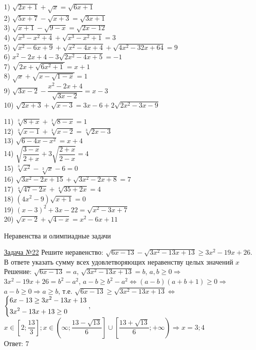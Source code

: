 \documentclass[a4paper,12pt]{article} %
\begin{document}
\begin{minipage}{0.5\linewidth}
	1) $\sqrt{2x+1}+\sqrt{x}=\sqrt{6x+1}$ \\
    2) $\sqrt{5x+7}-\sqrt{x+3}=\sqrt{3x+1}$ \\
    3) $\sqrt{x+1}-\sqrt{9-x}=\sqrt{2x-12}$ \\
    4) $\sqrt{x^3-x^2+4}+\sqrt{x^3-x^2+1}=3$ \\
    5) $\sqrt{x^2-6x+9}+\sqrt{x^2-4x+4}+\sqrt{4x^2-32x+64}=9$ \\
    6) $x^2-2x+4-3\sqrt{2x^2-4x+5}=-1$ \\
    7) $\sqrt{2x+\sqrt{6x^2+1}}=x+1$ \\
    8) $\sqrt{x}+\sqrt{x-\sqrt{1-x}}=1$ \\
    9) $\sqrt{3x-2}-\dfrac{x^2-2x+4}{\sqrt{3x-2}}=x-3$ \\
    10) $\sqrt{2x+3}+\sqrt{x-3}=3x-6+2\sqrt{2x^2-3x-9}$ \\
\end{minipage}
\begin{minipage}{0.5\linewidth}
	11) $\sqrt[3]{8+x}+\sqrt[3]{8-x}=1$ \\
	12) $\sqrt[3]{x-1}+\sqrt[3]{x-2}=\sqrt[3]{2x-3}$ \\
	13) $\sqrt{6-4x-x^2}=x+4$ \\
	14) $\sqrt{\dfrac{3-x}{2+x}}+3\sqrt{\dfrac{2+x}{2-x}}=4$\\
	15) $\sqrt[3]{x^2}-\sqrt[3]{x}-6=0$\\
	16) $\sqrt{3x^2-2x+15}+\sqrt{3x^2-2x+8}=7$ \\
	17) $\sqrt[4]{47-2x} + \sqrt[4]{35+2x}=4$ \\
	18) $(4x^2-9)\sqrt{x+1}=0$\\
	19) $(x-3)^2+3x-22=\sqrt{x^2-3x+7}$\\
	20) $\sqrt{x-2}+\sqrt{4-x}=x^2-6x+11$
\end{minipage}

\begin{center}
{\large Неравенства и олимпиадные задачи}
\end{center}

\label{Problem22}
\underline{Задача №22}
Решите неравенство: $\sqrt{6x-13}-\sqrt{3x^2-13x+13} \ge 3x^2-19x+26$. 
В ответе указать сумму всех удовлетворяющих неравенству целых значений $x$\\
Решение: $\sqrt{6x-13}=a$, $\sqrt{3x^2-13x+13}=b$, $a, b \ge 0 \Rightarrow$
$3x^2-19x+26=b^2-a^2$, $a-b \ge b^2-a^2 \Leftrightarrow (a-b)(a+b+1) \ge 0 \Rightarrow$
$a-b \ge 0 \Rightarrow a \ge b$, т.е. $\sqrt{6x-13} \ge \sqrt{3x^2-13x+13} \Leftrightarrow$
$\begin{dcases}
	6x-13 \ge 3x^2-13x+13 \\
	3x^2-13x+13 \ge 0
\end{dcases}, $ 
$x \in \left[ 2;\dfrac{13}{3} \right] ; x \in \left( \infty; \dfrac{13-\sqrt{13}}{6} \right] \cup \left[ \dfrac{13+\sqrt{13}}{6}; +\infty \right) \Rightarrow x=3;4$\\
Ответ: $7$
\end{document}
